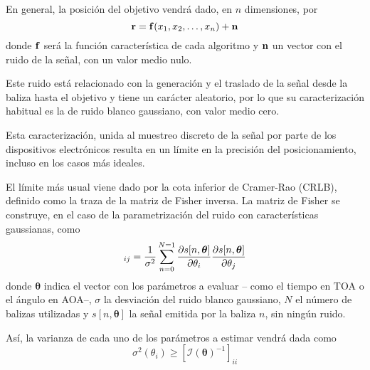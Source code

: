 En general, la posición del objetivo vendrá dado, en $n$ dimensiones, por
\begin{equation}\label{eq:geom}
    \vb{r} = \vb{f}(x_1, x_2, \ldots, x_n) + \vb{n}
\end{equation}
donde $\vb{f}$ será la función característica de cada algoritmo y $\vb{n}$ un vector con el ruido de la señal, con un valor medio nulo.



Este ruido está relacionado con la generación y el traslado de la señal desde la baliza hasta el objetivo y tiene un carácter aleatorio, por lo que su caracterización habitual es la de ruido blanco gaussiano, con valor medio cero.

Esta caracterización, unida al muestreo discreto de la señal por parte de los dispositivos electrónicos resulta en un límite en la precisión del posicionamiento, incluso en los casos más ideales.

El límite más usual viene dado por la cota inferior de Cramer-Rao (CRLB), definido como la traza de la matriz de Fisher inversa.
La matriz de Fisher se construye, en el caso de la parametrización del ruido con características gaussianas, como \cite{Xbook}
\begin{equation}
    [\mathcal{I}(\bm{\theta})]_{ij} = \frac{1}{\sigma^2} \sum_{n=0}^{N=1} \pdv{s[n,\bm{\theta}]}{\theta_i}\pdv{s[n,\bm{\theta}]}{\theta_j}
\end{equation}
donde $\bm{\theta}$ indica el vector con los parámetros a evaluar -- como el tiempo en TOA o el ángulo en AOA--, $\sigma$ la desviación del ruido blanco gaussiano, $N$ el número de balizas utilizadas y $s[n,\bm{\theta}]$ la señal emitida por la baliza $n$, sin ningún ruido.

Así, la varianza de cada uno de los parámetros a estimar vendrá dada como
\begin{equation}
    \sigma^2(\theta_i) \geq [\mathcal{I}(\bm{\theta})^{-1}]_{ii}
\end{equation}

